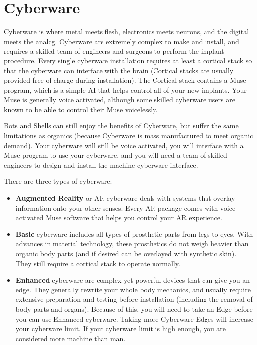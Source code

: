 
\section{Cyberware}
\label{sec:cyberware}

\begin{multicols}{2}

Cyberware is where metal meets flesh, electronics meets neurons, and the digital meets the analog. Cyberware are extremely complex to make and install, and requires a skilled team of engineers and surgeons to perform the implant procedure. Every single cyberware installation requires at least a cortical stack so that the cyberware can interface with the brain (Cortical stacks are usually provided free of charge during installation). The Cortical stack contains a Muse program, which is a simple AI that helps control all of your new implants. Your Muse is generally voice activated, although some skilled cyberware users are known to be able to control their Muse voicelessly.

Bots and Shells can still enjoy the benefits of Cyberware, but suffer the same limitations as organics (because Cyberware is mass manufactured to meet organic demand). Your cyberware will still be voice activated, you will interface with a Muse program to use your cyberware, and you will need a team of skilled engineers to design and install the machine-cyberware interface.

There are three types of cyberware:

\begin{itemize}
  \item \textbf{Augmented Reality} or AR cyberware deals with systems that overlay information onto your other senses. Every AR package comes with voice activated Muse software that helps you control your AR experience.
  \item \textbf{Basic} cyberware includes all types of prosthetic parts from legs to eyes. With advances in material technology, these prosthetics do not weigh heavier than organic body parts (and if desired can be overlayed with synthetic skin). They still require a cortical stack to operate normally.
  \item \textbf{Enhanced} cyberware are complex yet powerful devices that can give you an edge. They generally rewrite your whole body mechanics, and usually require extensive preparation and testing before installation (including the removal of body-parts and organs). Because of this, you will need to take an Edge before you can use Enhanced cyberware. Taking more Cyberware Edges will increase your cyberware limit. If your cyberware limit is high enough, you are considered more machine than man. 
\end{itemize}


\end{multicols}
